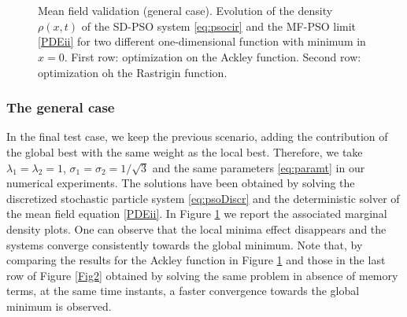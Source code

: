 \documentclass{ims9x6}
\begin{document}
\begin{figure}[htb]
\begin{minipage}{\linewidth}
\centering
{}\
 \
 \\
\
 \
\caption{Mean field validation (general case). Evolution of the density $\rho(x,t)$ of the SD-PSO system \eqref{eq:psocir} and the MF-PSO limit \eqref{PDEii} for two different one-dimensional function with minimum in $x=0$. First row: optimization on the Ackley function. Second row: optimization oh the Rastrigin function.}
\label{Fig6}
\end{minipage}
\end{figure}
\subsubsection{The general case}
In the final test case, we keep the previous scenario, adding the contribution of the global best with the same weight as the local best. Therefore, we take $\lambda_1=\lambda_2=1$, $\sigma_1=\sigma_2={1}/{\sqrt{3}}$ and the same parameters \eqref{eq:paramt} in our numerical experiments. The solutions have been obtained by solving the discretized stochastic particle system \eqref{eq:psoDiscr} and the deterministic solver of the mean field equation \eqref{PDEii}. In Figure \ref{Fig6} we report the associated marginal density plots.
One can observe that the local minima effect disappears and the systems converge consistently towards the global minimum. Note that, by comparing the results for the Ackley function in Figure \ref{Fig6} and those in the last row of Figure \ref{Fig2} obtained by solving the same problem in absence of memory terms, at the same time instants, a faster convergence towards the global minimum is observed.
\end{document}
